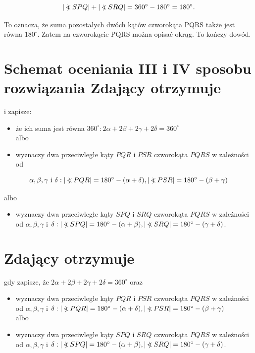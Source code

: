 \documentclass[10pt]{article}
\newcommand\Varangle{\mathop{{<\!\!\!\!\!\text{\small)}}\:}\nolimits}
\begin{document}
$$
|\Varangle S P Q|+|\Varangle S R Q|=360^{\circ}-180^{\circ}=180^{\circ} .
$$

To oznacza, że suma pozostałych dwóch kątów czworokąta PQRS także jest równa $180^{\circ}$. Zatem na czworokącie PQRS można opisać okrąg. To kończy dowód.

\section*{Schemat oceniania III i IV sposobu rozwiązania Zdający otrzymuje}
i zapisze:

\begin{itemize}
  \item że ich suma jest równa $360^{\circ}: 2 \alpha+2 \beta+2 \gamma+2 \delta=360^{\circ}$\\
albo
  \item wyznaczy dwa przeciwległe kąty $P Q R$ i $P S R$ czworokąta $P Q R S$ w zależności od
\end{itemize}

$$
\alpha, \beta, \gamma \text { i } \delta:|\Varangle P Q R|=180^{\circ}-(\alpha+\delta),|\Varangle P S R|=180^{\circ}-(\beta+\gamma)
$$

albo

\begin{itemize}
  \item wyznaczy dwa przeciwległe kąty $S P Q$ i $S R Q$ czworokąta $P Q R S$ w zależności od $\alpha, \beta, \gamma$ i $\delta:|\Varangle S P Q|=180^{\circ}-(\alpha+\beta),|\Varangle S R Q|=180^{\circ}-(\gamma+\delta)$.
\end{itemize}

\section*{Zdający otrzymuje}
gdy zapisze, że $2 \alpha+2 \beta+2 \gamma+2 \delta=360^{\circ}$ oraz

\begin{itemize}
  \item wyznaczy dwa przeciwległe kąty $P Q R$ i $P S R$ czworokąta $P Q R S$ w zależności od $\alpha, \beta, \gamma$ i $\delta:|\Varangle P Q R|=180^{\circ}-(\alpha+\delta),|\Varangle P S R|=180^{\circ}-(\beta+\gamma)$\\
albo
  \item wyznaczy dwa przeciwległe kąty $S P Q$ i $S R Q$ czworokąta $P Q R S$ w zależności od $\alpha, \beta, \gamma$ i $\delta:|\Varangle S P Q|=180^{\circ}-(\alpha+\beta),|\Varangle S R Q|=180^{\circ}-(\gamma+\delta)$.
\end{itemize}
\end{document}
